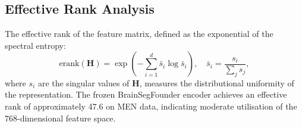 \subsection{Effective Rank Analysis}
\label{sec:dgap:rank}

The effective rank of the feature matrix, defined as the exponential of the
spectral entropy:
\begin{equation}
  \text{erank}(\mathbf{H}) = \exp\!\left(-\sum_{i=1}^{d} \bar{s}_i
    \log \bar{s}_i\right),
  \quad \bar{s}_i = \frac{s_i}{\sum_j s_j},
  \label{eq:erank}
\end{equation}
where $s_i$ are the singular values of $\mathbf{H}$, measures the
distributional uniformity of the representation. The frozen BrainSegFounder
encoder achieves an effective rank of approximately 47.6 on MEN data,
indicating moderate utilisation of the 768-dimensional feature space.
